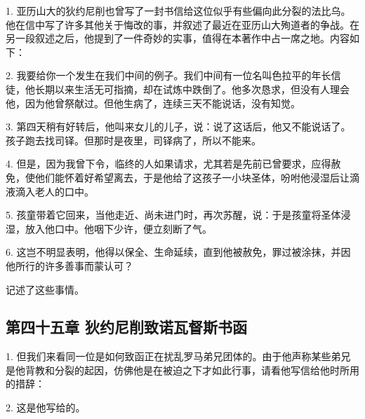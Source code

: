 1. 亚历山大的狄约尼削也曾写了一封书信给这位似乎有些偏向此分裂的法比乌。他在信中写了许多其他关于悔改的事，并叙述了最近在亚历山大殉道者的争战。在另一段叙述之后，他提到了一件奇妙的实事，值得在本著作中占一席之地。内容如下：\par

2. 我要给你一个发生在我们中间的例子。我们中间有一位名叫色拉平的年长信徒，他长期以来生活无可指摘，却在试炼中跌倒了。他多次恳求，但没有人理会他，因为他曾祭献过。但他生病了，连续三天不能说话，没有知觉。\par

3. 第四天稍有好转后，他叫来女儿的儿子，说：说了这话后，他又不能说话了。孩子跑去找司铎。但那时是夜里，司铎病了，所以不能来。\par

4. 但是，因为我曾下令，临终的人如果请求，尤其若是先前已曾要求，应得赦免，使他们能怀着好希望离去，于是他给了这孩子一小块圣体，吩咐他浸湿后让滴液滴入老人的口中。\par

5. 孩童带着它回来，当他走近、尚未进门时，再次苏醒，说：于是孩童将圣体浸湿，放入他口中。他咽下少许，便立刻断了气。\par

6. 这岂不明显表明，他得以保全、生命延续，直到他被赦免，罪过被涂抹，并因他所行的许多善事而蒙认可？\par

记述了这些事情。\par


\subsection{第四十五章 狄约尼削致诺瓦督斯书函}

1. 但我们来看同一位是如何致函正在扰乱罗马弟兄团体的。由于他声称某些弟兄是他背教和分裂的起因，仿佛他是在被迫之下才如此行事，请看他写信给他时所用的措辞：\par

2. 这是他写给的。\par

